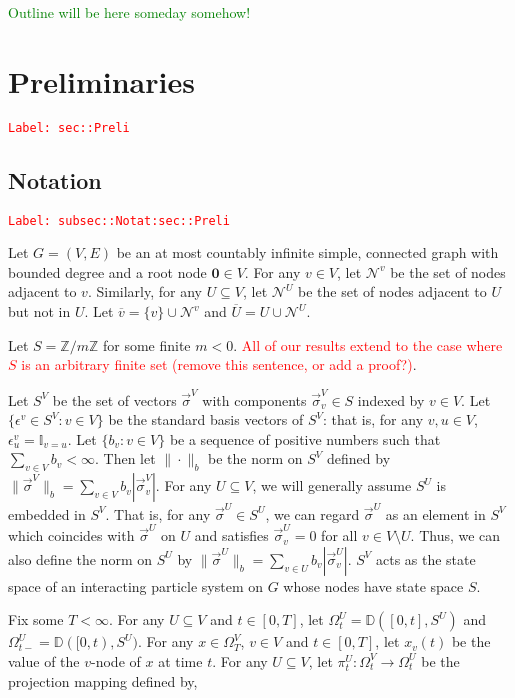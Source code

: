 \documentclass[12pt]{article}
\newcommand{\mb}{\mathbb}
\newcommand{\mc}{\mathcal}
\newcommand{\ra}{\rightarrow}
\newcommand{\ov}{\overline}
\newcommand{\ep}{\epsilon}
\newcommand{\tr}{\textcolor{red}}
\newcommand{\tg}{\textcolor{green}}
\newcommand{\labe}[1]{\tr{\texttt{Label: #1}}}
\newcommand{\ind}{\hspace{24pt}}
\newcommand{\cad}{\mb{D}}							%
\renewcommand{\root}{\mathbf{0}}				%
\renewcommand{\v}{v}							%
\newcommand{\vv}{u}								%
\renewcommand{\U}{U}							%
\renewcommand{\S}{S}							%
\newcommand{\s}{\sigma}							%
\newcommand{\sv}{\vec{\s}}						%
\renewcommand{\b}{b}							%
\newcommand{\ev}{\ep}							%
\newcommand{\T}{T}								%
\newcommand{\x}{x}								%
\renewcommand{\t}{t}							%
\newcommand{\sset}{\Omega}						%
\newcommand{\proj}{\pi}							%
\newcommand{\neigh}{\mc{N}}						%
\newcommand{\vind}[1]{^{#1}}					%
\newcommand{\carp}[1]{^{#1}}					%
\newcommand{\vsi}[1]{^{#1}}						%
\newcommand{\cind}[1]{_{#1}}					%
\newcommand{\cl}{\ov}							%
\newcommand{\tp}[1]{(#1)}						%
\newcommand{\ts}[1]{_{#1}}						%
\begin{document}
\tg{Outline will be here someday somehow!}


\section{Preliminaries}
\label{sec::Preli}\labe{sec::Preli}

\subsection{Notation}
\label{subsec::Notat:sec::Preli}\labe{subsec::Notat:sec::Preli}

Let \(G = (V,E)\) be an at most countably infinite simple, connected graph with bounded degree and a root node \(\root \in V\). For any \(\v \in V\), let \(\neigh\vind{\v}\) be the set of nodes adjacent to \(\v\). Similarly, for any \(\U \subseteq V\), let \(\neigh\vind{\U}\) be the set of nodes adjacent to \(\U\) but not in \(\U\). Let \(\cl{\v} = \{\v\}\cup\neigh\vind{\v}\) and \(\cl{\U} = \U\cup \neigh\vind{\U}\). 

\ind Let \(S = \mb{Z}/m\mb{Z}\) for some finite \(m < 0\). \tr{All of our results extend to the case where \(\S\) is an arbitrary finite set (remove this sentence, or add a proof?)}.

\ind Let \(\S\carp{V}\) be the set of vectors \(\sv\vsi{V}\) with components \(\sv\cind{\v}\vsi{V} \in \S\) indexed by \(\v\in V\). Let \(\{\ev\vind{\v}\in\S\carp{V}: \v\in V\}\) be the standard basis vectors of \(\S\carp{V}\): that is, for any \(\v,\vv\in V\), \(\ev\vind{\v}\cind{\vv} = \mb{I}_{\v = \vv}\). Let \(\{\b\cind{\v}:\v\in V\}\) be a sequence of positive numbers such that \(\sum_{\v\in V} \b\cind{\v} < \infty\). Then let \(\|\cdot\|_{\b}\) be the norm on \(\S\carp{V}\) defined by \(\|\sv\vsi{V}\|_{\b} = \sum_{\v\in V} \b\cind{\v}|\sv\cind{\v}\vsi{V}|\). For any \(\U\subseteq V\), we will generally assume \(\S\carp{\U}\) is embedded in \(\S\carp{V}\). That is, for any \(\sv\vsi{\U}\in \S\carp{\U}\), we can regard \(\sv\vsi{\U}\) as an element in \(\S\carp{V}\) which coincides with \(\sv\vsi{\U}\) on \(\U\) and satisfies \(\sv\vsi{\U}\cind{\v} = 0\) for all \(\v\in V\setminus \U\). Thus, we can also define the norm on \(\S\carp{\U}\) by \(\|\sv\vsi{\U}\|_{\b} = \sum_{\v\in\U} \b\cind{\v}|\sv\cind{\v}\vsi{\U}|\). \(\S\carp{V}\) acts as the state space of an interacting particle system on \(G\) whose nodes have state space \(\S\).

\ind Fix some \(\T < \infty\). For any \(\U\subseteq V\) and \(\t\in [0,\T]\), let \(\sset\vsi{\U}\ts{\t} = \cad([0,\t],\S\carp{\U})\) and \(\sset\vsi{\U}\ts{\t-} = \cad([0,\t),\S\carp{\U})\). For any \(\x \in \sset\vsi{V}\ts{\T}\), \(\v\in V\) and  \(\t \in [0,\T]\), let \(\x\cind{\v}\tp{\t}\) be the value of the \(\v\)-node of \(\x\) at time \(\t\). For any \(U\subseteq V\), let \(\proj\vsi{\U}\ts{\t}: \sset\vsi{V}\ts{\t} \ra \sset\vsi{\U}\ts{\t}\) be the projection mapping defined by,
\end{document}
